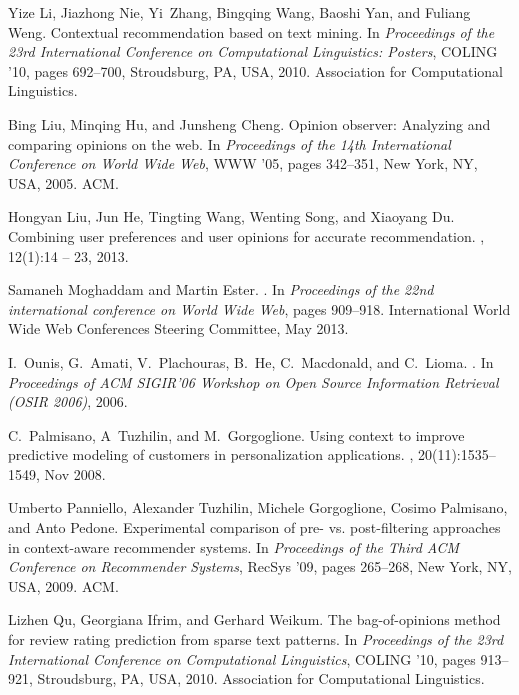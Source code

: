 \documentclass[preprint,12pt]{elsarticle}
\begin{document}
\begin{thebibliography}{10}
Yize Li, Jiazhong Nie, Yi~Zhang, Bingqing Wang, Baoshi Yan, and Fuliang Weng.
\newblock Contextual recommendation based on text mining.
\newblock In {\em Proceedings of the 23rd International Conference on
  Computational Linguistics: Posters}, COLING '10, pages 692--700, Stroudsburg,
  PA, USA, 2010. Association for Computational Linguistics.

Bing Liu, Minqing Hu, and Junsheng Cheng.
\newblock Opinion observer: Analyzing and comparing opinions on the web.
\newblock In {\em Proceedings of the 14th International Conference on World
  Wide Web}, WWW '05, pages 342--351, New York, NY, USA, 2005. ACM.

Hongyan Liu, Jun He, Tingting Wang, Wenting Song, and Xiaoyang Du.
\newblock Combining user preferences and user opinions for accurate
  recommendation.
, 12(1):14 -- 23,
  2013.

Samaneh Moghaddam and Martin Ester.
.
\newblock In {\em Proceedings of the 22nd international conference on World
  Wide Web}, pages 909--918. International World Wide Web Conferences Steering
  Committee, May 2013.

I.~Ounis, G.~Amati, V.~Plachouras, B.~He, C.~Macdonald, and C.~Lioma.
.
\newblock In {\em Proceedings of ACM SIGIR'06 Workshop on Open Source
  Information Retrieval (OSIR 2006)}, 2006.

C.~Palmisano, A~Tuzhilin, and M.~Gorgoglione.
\newblock Using context to improve predictive modeling of customers in
  personalization applications.
,
  20(11):1535--1549, Nov 2008.

Umberto Panniello, Alexander Tuzhilin, Michele Gorgoglione, Cosimo Palmisano,
  and Anto Pedone.
\newblock Experimental comparison of pre- vs. post-filtering approaches in
  context-aware recommender systems.
\newblock In {\em Proceedings of the Third ACM Conference on Recommender
  Systems}, RecSys '09, pages 265--268, New York, NY, USA, 2009. ACM.

Lizhen Qu, Georgiana Ifrim, and Gerhard Weikum.
\newblock The bag-of-opinions method for review rating prediction from sparse
  text patterns.
\newblock In {\em Proceedings of the 23rd International Conference on
  Computational Linguistics}, COLING '10, pages 913--921, Stroudsburg, PA, USA,
  2010. Association for Computational Linguistics.


\end{thebibliography}
\end{document}
